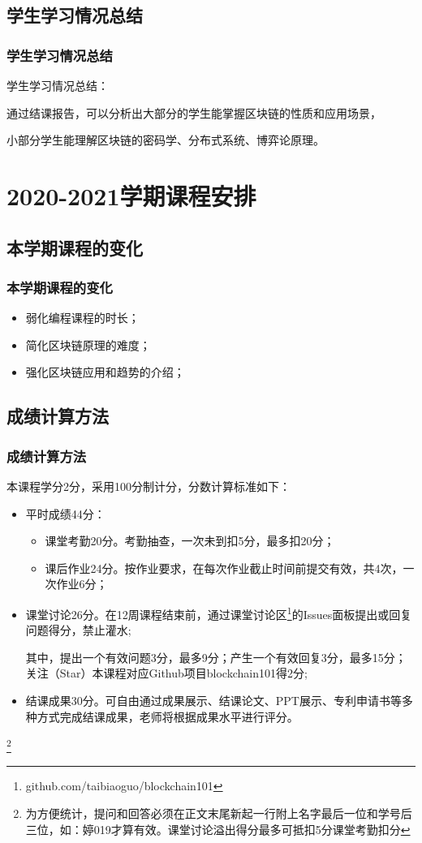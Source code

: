 \documentclass[11pt]{beamer}
\begin{document}
	\subsection{学生学习情况总结}
	\begin{frame}
		\frametitle{学生学习情况总结}
	学生学习情况总结：
	
	通过结课报告，可以分析出大部分的学生能掌握区块链的性质和应用场景，
	
	小部分学生能理解区块链的密码学、分布式系统、博弈论原理。
\end{frame}

\section{2020-2021学期课程安排}
	\subsection{本学期课程的变化}
	\begin{frame}
		\frametitle{本学期课程的变化}
		\begin{itemize}
			\item 弱化编程课程的时长；
			\item 简化区块链原理的难度；
			\item 强化区块链应用和趋势的介绍；
		\end{itemize}
	\end{frame}

	\subsection{成绩计算方法}
	\begin{frame}
		\frametitle{成绩计算方法}
		本课程学分2分，采用100分制计分，分数计算标准如下：
			\begin{itemize}
				\item 平时成绩44分：
				\begin{itemize}
					\item 课堂考勤20分。考勤抽查，一次未到扣5分，最多扣20分；
					\item 课后作业24分。按作业要求，在每次作业截止时间前提交有效，共4次，一次作业6分；
				\end{itemize}
				\item 课堂讨论26分。在12周课程结束前，通过课堂讨论区\footnote{github.com/taibiaoguo/blockchain101}的Issues面板提出或回复问题得分，禁止灌水;
				
				其中，提出一个有效问题3分，最多9分；产生一个有效回复3分，最多15分；关注（Star）本课程对应Github项目blockchain101得2分;
				\item 结课成果30分。可自由通过成果展示、结课论文、PPT展示、专利申请书等多种方式完成结课成果，老师将根据成果水平进行评分。
			\end{itemize}
		\footnote{为方便统计，提问和回答必须在正文末尾新起一行附上名字最后一位和学号后三位，如：婷019才算有效。课堂讨论溢出得分最多可抵扣5分课堂考勤扣分}
	\end{frame}
\end{document}
